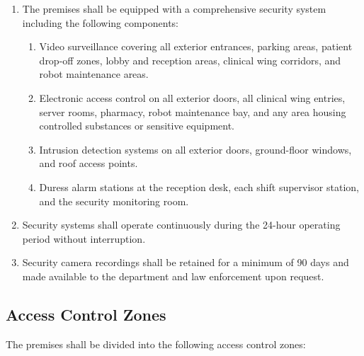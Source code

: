 \begin{enumerate}[label=(\alph*)]
\item The premises shall be equipped with a comprehensive security system
  including the following components:
  \begin{enumerate}[label=(\arabic*)]
  \item Video surveillance covering all exterior entrances, parking areas,
    patient drop-off zones, lobby and reception areas, clinical wing corridors,
    and robot maintenance areas.
  \item Electronic access control on all exterior doors, all clinical wing
    entries, server rooms, pharmacy, robot maintenance bay, and any area
    housing controlled substances or sensitive equipment.
  \item Intrusion detection systems on all exterior doors, ground-floor windows,
    and roof access points.
  \item Duress alarm stations at the reception desk, each shift supervisor
    station, and the security monitoring room.
  \end{enumerate}

\item Security systems shall operate continuously during the 24-hour operating
  period without interruption.

\item Security camera recordings shall be retained for a minimum of 90 days
  and made available to the department and law enforcement upon request.
\end{enumerate}

\subsection{Access Control Zones}

The premises shall be divided into the following access control zones:

